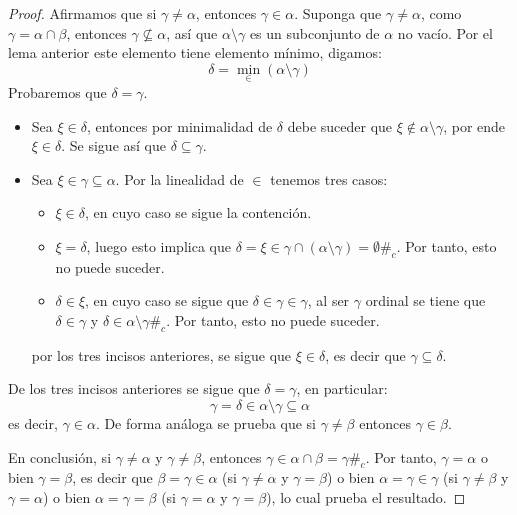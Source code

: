 \documentclass[12pt]{report}
\newcounter{it}
\theoremstyle{largebreak}
\newcommand\contradiction{\ensuremath{\#_c}}
\begin{document}
\begin{proof}
        Afirmamos que si $\gamma\neq\alpha$, entonces $\gamma\in\alpha$. Suponga que $\gamma\neq\alpha$, como $\gamma=\alpha\cap\beta$, entonces $\gamma\nsubseteq\alpha$, así que $\alpha\setminus\gamma$ es un subconjunto de $\alpha$ no vacío. Por el lema anterior este elemento tiene elemento mínimo, digamos:
        \begin{equation*}
            \delta=\min_{\in}(\alpha\setminus\gamma)
        \end{equation*}
        Probaremos que $\delta=\gamma$.
        \begin{itemize}
            \item Sea $\xi\in\delta$, entonces por minimalidad de $\delta$ debe suceder que $\xi\notin \alpha\setminus\gamma$, por ende $\xi\in\delta$. Se sigue así que $\delta\subseteq\gamma$.
            \item Sea $\xi\in\gamma\subseteq\alpha$. Por la linealidad de $\in$ tenemos tres casos:
            \begin{itemize}
                \item $\xi\in\delta$, en cuyo caso se sigue la contención.
                \item $\xi=\delta$, luego esto implica que $\delta=\xi\in\gamma\cap(\alpha\setminus\gamma)=\emptyset$\contradiction. Por tanto, esto no puede suceder.
                \item $\delta\in\xi$, en cuyo caso se sigue que $\delta\in\gamma\in\gamma$, al ser $\gamma$ ordinal se tiene que $\delta\in\gamma$ y $\delta\in\alpha\setminus\gamma$\contradiction. Por tanto, esto no puede suceder.
            \end{itemize}
            por los tres incisos anteriores, se sigue que $\xi\in\delta$, es decir que $\gamma\subseteq\delta$.
        \end{itemize}
        De los tres incisos anteriores se sigue que $\delta=\gamma$, en particular:
        \begin{equation*}
            \gamma=\delta\in\alpha\setminus\gamma\subseteq\alpha
        \end{equation*}
        es decir, $\gamma\in\alpha$. De forma análoga se prueba que si $\gamma\neq\beta$ entonces $\gamma\in\beta$.

        En conclusión, si $\gamma\neq\alpha$ y $\gamma\neq\beta$, entonces $\gamma\in\alpha\cap\beta=\gamma$\contradiction. Por tanto, $\gamma=\alpha$ o bien $\gamma=\beta$, es decir que $\beta=\gamma\in\alpha$ (si $\gamma\neq\alpha$ y $\gamma=\beta$) o bien $\alpha=\gamma\in\gamma$ (si $\gamma\neq\beta$ y $\gamma=\alpha$) o bien $\alpha=\gamma=\beta$ (si $\gamma=\alpha$ y $\gamma=\beta$), lo cual prueba el resultado.
    \end{proof}
    
\end{document}

